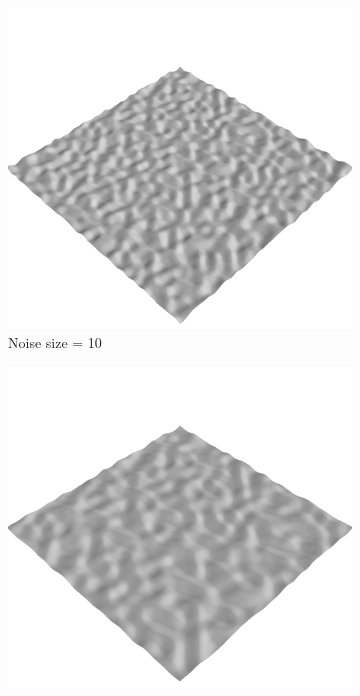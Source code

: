 \documentclass[../document.tex]{subfiles}
\begin{document}
\begin{figure}[htbp]
        \begin{subfigure}[b]{0.23\textwidth}
            \includegraphics[width=\textwidth]{../img/data-aug/3d/simplex1.png}
            \caption{Noise size = 10}
        \end{subfigure}
        \begin{subfigure}[b]{0.23\linewidth}
            \includegraphics[width=\textwidth]{../img/data-aug/3d/simplex2.png}

\end{subfigure}
\end{figure}
\end{document}
